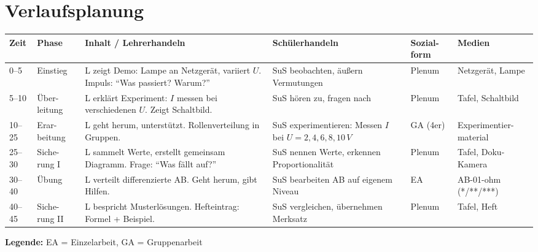 \documentclass[11pt,a4paper]{article}
\begin{document}
\section{Verlaufsplanung}

\begin{longtable}{|p{1cm}|p{1.5cm}|p{4cm}|p{3cm}|p{2cm}|p{2cm}|}
\hline
\textbf{Zeit} & \textbf{Phase} & \textbf{Inhalt / Lehrerhandeln} & \textbf{Schülerhandeln} & \textbf{Sozial-form} & \textbf{Medien} \\
\hline
\endhead

0--5 & Einstieg & L zeigt Demo: Lampe an Netzgerät, variiert $U$. Impuls: ``Was passiert? Warum?'' & SuS beobachten, äußern Vermutungen & Plenum & Netzgerät, Lampe \\
\hline

5--10 & Über-leitung & L erklärt Experiment: $I$ messen bei verschiedenen $U$. Zeigt Schaltbild. & SuS hören zu, fragen nach & Plenum & Tafel, Schaltbild \\
\hline

10--25 & Erar-beitung & L geht herum, unterstützt. Rollenverteilung in Gruppen. & SuS experimentieren: Messen $I$ bei $U = 2, 4, 6, 8, 10\,\si{V}$ & GA (4er) & Experimentier-material \\
\hline

25--30 & Siche-rung I & L sammelt Werte, erstellt gemeinsam Diagramm. Frage: ``Was fällt auf?'' & SuS nennen Werte, erkennen Proportionalität & Plenum & Tafel, Doku-Kamera \\
\hline

30--40 & Übung & L verteilt differenzierte AB. Geht herum, gibt Hilfen. & SuS bearbeiten AB auf eigenem Niveau & EA & AB-01-ohm (*/**/***) \\
\hline

40--45 & Siche-rung II & L bespricht Musterlösungen. Hefteintrag: Formel + Beispiel. & SuS vergleichen, übernehmen Merksatz & Plenum & Tafel, Heft \\
\hline
\end{longtable}

\textbf{Legende:} EA = Einzelarbeit, GA = Gruppenarbeit

\end{document}
